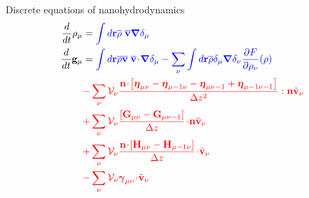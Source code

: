 \documentclass{beamer}
\newcommand{\esc}{\!\cdot\!}
\newcommand{\llg}{\left\lgroup}
\newcommand{\rlg}{\right\rgroup}
\begin{document}

\begin{frame}{Discrete equations of nanohydrodynamics}
\begin{align}
  \frac{d}{dt}\rho_\mu&=  {\color{blue} \int d{\bf r}\overline{\rho} \; \overline{\bf v}\boldsymbol{\nabla}\delta_\mu }
\nonumber\\
\frac{d}{dt}{\bf g}_\mu&=
  {\color{blue} \int d{\bf r}\overline{\rho} \overline{\bf v}\;\overline{\bf v}\esc\boldsymbol{\nabla}\delta_{\mu}
  -\sum_\nu\int d{\bf r}\overline{\rho}\delta_{\mu}\boldsymbol{\nabla}\delta_{\nu}
\frac{\partial  F}{\partial \rho_{\nu}}(\rho)}
\nonumber\\
&{\color{red}-\sum_{\nu}{\cal V}_\nu \frac{{\bf n}\esc\left[\boldsymbol{\eta}_{\mu\nu}-\boldsymbol{\eta}_{\mu-1\nu}-\boldsymbol{\eta}_{\mu\nu-1}+\boldsymbol{\eta}_{\mu-1\nu-1}\right]}{\Delta z^2}:{\bf n}\tilde{\bf v}_\nu}
\nonumber\\
&{\color{red}+\sum_{\nu}{\cal V}_\nu\frac{\left[{\bf G}_{\mu\nu}-{\bf G}_{\mu\nu-1}\right]}{\Delta z}\esc{\bf n}\tilde{\bf v}_\nu}
\nonumber\\
&{\color{red}+\sum_{\nu}{\cal V}_\nu\frac{{\bf n}\esc\left[{\bf H}_{\mu\nu}-{\bf H}_{\mu-1\nu}\right]}{\Delta z}\esc\tilde{\bf v}_\nu}
\nonumber\\
&{\color{red}-\sum_{\nu}{\cal V}_\nu\boldsymbol{\gamma}_{\mu\nu}\esc\tilde{\bf v}_\nu}
\nonumber
\end{align}
\end{frame}
\end{document}
